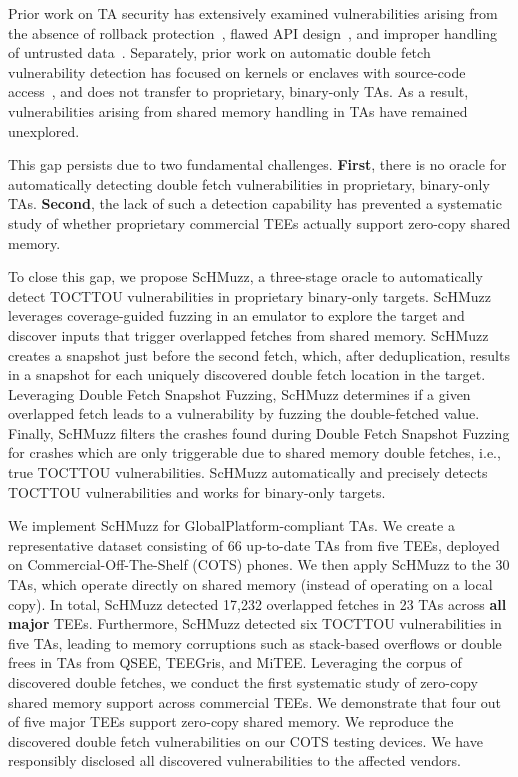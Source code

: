 \documentclass[conference]{IEEEtran}
\newcommand{\sysname}{ScHMuzz\xspace}
\newcommand{\stagetwo}{Double Fetch Snapshot Fuzzing\xspace}
\newcommand{\mitee}{MiTEE\xspace}
\newcommand{\teegris}{TEEGris\xspace}
\newcommand{\qsee}{QSEE\xspace}
\newcommand{\numTAs}{66\xspace}
\newcommand{\numTAsharnessed}{30\xspace}
\newcommand{\numTEEs}{five\xspace}
\newcommand{\numTAsdf}{23\xspace}
\newcommand{\numdfsmerge}{17,232\xspace}
\newcommand{\numvulns}{six\xspace}
\newcommand{\numvulnTAs}{five\xspace}
\begin{document}
Prior work on TA security has extensively examined vulnerabilities arising from 
the absence of rollback protection~\cite{rollback}, flawed API design~\cite{globalconfusion}, 
and improper handling of untrusted data~\cite{AdamskiGuilbonPeterlin2019SamsungTrustZone,teezz,trustdies}. 
Separately, prior work on automatic double fetch vulnerability detection has focused on kernels 
or enclaves with source-code access~\cite{decaf,deadline,wang2017double,chen2024enclavefuzz}, 
and does not transfer to proprietary, binary-only TAs. 
As a result, vulnerabilities arising from shared memory handling in TAs have remained unexplored.

This gap persists due to two fundamental challenges. \textbf{First}, there is no oracle for
automatically detecting double fetch vulnerabilities in proprietary, binary-only TAs.
\textbf{Second}, the lack of such a detection capability has prevented a systematic study of
whether proprietary commercial TEEs actually support zero-copy shared memory. 

To close this gap, we propose \sysname, a three-stage oracle to 
automatically detect TOCTTOU vulnerabilities in proprietary binary-only targets. 
\sysname leverages coverage-guided fuzzing in an emulator to explore the target and 
discover inputs that trigger overlapped fetches from shared memory. \sysname creates 
a snapshot just before the second fetch, which, after deduplication, results in a 
snapshot for each uniquely discovered double fetch location in the target.
Leveraging \stagetwo, \sysname determines if a given overlapped fetch leads 
to a vulnerability by fuzzing the double-fetched value. 
Finally, \sysname filters the crashes found during \stagetwo 
for crashes which are only triggerable due to shared memory double fetches, i.e., true 
TOCTTOU vulnerabilities. \sysname automatically 
and precisely detects TOCTTOU vulnerabilities and works for binary-only 
targets.

We implement \sysname for GlobalPlatform-compliant TAs. We create a representative dataset consisting of 
\numTAs{} up-to-date TAs from \numTEEs{} TEEs, deployed on Commercial-Off-The-Shelf (COTS) phones. 
We then apply \sysname to the \numTAsharnessed{} TAs, which operate directly on shared memory (instead of 
operating on a local copy).
In total, \sysname detected \numdfsmerge{} overlapped fetches in \numTAsdf TAs across \textbf{all major} TEEs. 
Furthermore, \sysname detected 
\numvulns{} TOCTTOU vulnerabilities in \numvulnTAs{} TAs, leading to memory corruptions such as 
stack-based overflows or double frees in TAs from \qsee, \teegris, and \mitee. 
Leveraging the corpus of discovered double fetches, we conduct the first systematic study of 
zero-copy shared memory support across commercial TEEs. 
We demonstrate that four out of five major TEEs support zero-copy shared memory.
We reproduce the discovered double fetch vulnerabilities on our COTS testing devices. 
We have responsibly disclosed all discovered vulnerabilities to the affected vendors.
\end{document}
